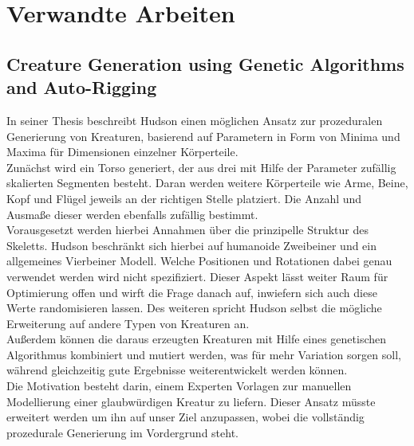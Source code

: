 \chapter{Verwandte Arbeiten}
\label{Verwandte_Arbeiten}


\section{Creature Generation using Genetic Algorithms and Auto-Rigging}
In seiner Thesis beschreibt Hudson \cite{Hudson2013CreatureGU} einen möglichen Ansatz zur prozeduralen Generierung von Kreaturen, basierend auf Parametern in Form von Minima und Maxima für Dimensionen einzelner Körperteile.\\ Zunächst wird ein Torso generiert, der aus drei mit Hilfe der Parameter zufällig skalierten Segmenten besteht. Daran werden weitere Körperteile wie Arme, Beine, Kopf und Flügel jeweils an der richtigen Stelle platziert. Die Anzahl und Ausmaße dieser werden ebenfalls zufällig bestimmt.\\
Vorausgesetzt werden hierbei Annahmen über die prinzipelle Struktur des Skeletts. Hudson beschränkt sich hierbei auf humanoide Zweibeiner und ein allgemeines Vierbeiner Modell. Welche Positionen und Rotationen dabei genau verwendet werden wird nicht spezifiziert. Dieser Aspekt lässt weiter Raum für Optimierung offen und wirft die Frage danach auf, inwiefern sich auch diese Werte randomisieren lassen. Des weiteren spricht Hudson selbst die mögliche Erweiterung auf andere Typen von Kreaturen an.\\
Außerdem können die daraus erzeugten Kreaturen mit Hilfe eines genetischen Algorithmus kombiniert und mutiert werden, was für mehr Variation sorgen soll, während gleichzeitig gute Ergebnisse weiterentwickelt werden können.\\
Die Motivation besteht darin, einem Experten Vorlagen zur manuellen Modellierung einer glaubwürdigen Kreatur zu liefern. Dieser Ansatz müsste erweitert werden um ihn auf unser Ziel anzupassen, wobei die vollständig prozedurale Generierung im Vordergrund steht.

